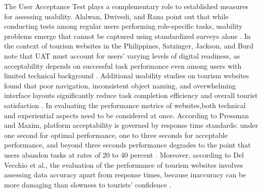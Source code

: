 \documentclass{research}
\begin{document}
The User Acceptance Test plays a complementary role to established measures for assessing usability. Alalwan, Dwivedi, and Rana point out that while conducting tests among regular users performing role-specific tasks, usability problems emerge that cannot be captured using standardized surveys alone \cite{utauttourism2023}. In the context of tourism websites in the Philippines, Satzinger, Jackson, and Burd note that UAT must account for users' varying levels of digital readiness, as acceptability depends on successful task performance even among users with limited technical background \cite{satzinger2021}. Additional usability studies on tourism websites found that poor navigation, inconsistent object naming, and overwhelming interface layouts significantly reduce task completion efficiency and overall tourist satisfaction \cite{huang2020,martinez2020}. In evaluating the performance metrics of websites,both technical and experiential aspects need to be considered at once. According to Pressman and Maxim, platform acceptability is governed by response time standards: under one second for optimal performance, one to three seconds for acceptable performance, and beyond three seconds performance degrades to the point that users abandon tasks at rates of 20 to 40 percent \cite{pressman2020}. Moreover, according to Del Vecchio et al., the evaluation of the performance of tourism websites involves assessing data accuracy apart from response times, because inaccuracy can be more damaging than slowness to tourists' confidence \cite{delvecchio2022}.
\end{document}
